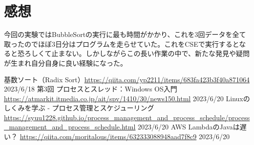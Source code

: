 \documentclass[a4j,dvipdfmx]{jsreport}
\begin{document}
\section{感想}
今回の実験ではBubbleSortの実行に最も時間がかかり、これを3回データを全て取ったのでほぼ3日分はプログラムを走らせていた。これをCSEで実行するとなると恐ろしくて止まない。しかしながらこの長い作業の中で、新たな発見や疑問が生まれ自分自身に良い経験になった。

\begin{thebibliography}{99}

 基数ソート（Radix Sort）\url{https://qiita.com/yp2211/items/683fa423b3f40a871064} 2023/6/18
 第3回 プロセスとスレッド：Windows OS入門
 \url{https://atmarkit.itmedia.co.jp/ait/spv/1410/30/news150.html} 2023/6/20
 Linuxのしくみを学ぶ - プロセス管理とスケジューリング \url{https://syuu1228.github.io/process_management_and_process_schedule/process_management_and_process_schedule.html} 2023/6/20
 AWS LambdaのJavaは遅い？ \url{https://qiita.com/moritalous/items/632333088948aad7f8c9} 2023/6/20


\end{thebibliography}
\end{document}

